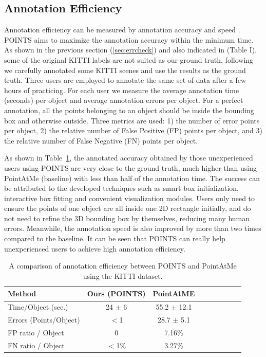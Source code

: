 \documentclass[letterpaper, 10 pt, conference]{ieeeconf}  %
\begin{document}
\subsection{Annotation Efficiency}

Annotation efficiency can be measured by annotation accuracy and speed \cite{pointatme} \cite{Zimmer20193DBA}. POINTS aims to maximize the annotation accuracy within the minimum time.
As shown in the previous section (\ref{sec:errcheck}) and also indicated in  \cite{pointatme} (Table I), some of the original KITTI labels are not suited as our ground truth, following \cite{pointatme} we carefully annotated some KITTI scenes and use the results as the ground truth.
Three users are employed to annotate the same set of data after a few hours of practicing. 
For each user we measure the average annotation time (seconds) per object and average annotation errors per object.
For a perfect annotation, all the points belonging to an object should be inside the bounding box and otherwise outside. 
Three metrics are used: 1) the number of error points per object, 
2) the relative number of False Positive (FP) points per object, and 
3) the relative number of False Negative (FN) points per object. 

As shown in Table~\ref{tab:annotation-evaluation}, the annotated accuracy obtained by those unexperienced users using POINTS are very close to the ground truth,
much higher than using PointAtMe (baseline) with less than half of the annotation time. 
The success can be attributed to the developed techniques such as smart box initialization, interactive box fitting and convenient visualization modules. 
Users only need to ensure the points of one object are all inside one 2D rectangle initially, and do not need to refine the 3D bounding box by themselves, 
reducing many human errors. 
Meanwhile, the annotation speed is also improved by more than two times compared to the baseline. 
It can be seen that POINTS can really help unexperienced users to achieve high annotation efficiency. 



\begin{table}[h]
	\centering
	\caption{A comparison of annotation efficiency between POINTS and PointAtMe using the KITTI dataset.}
	\label{tab:annotation-evaluation}
	\begin{tabular}{|l|c|c|c|c||c|c|c|c|}
		\hline
		\textbf{Method} & \textbf{Ours (POINTS)} & \textbf{PointAtME\cite{pointatme}} \\
		\hline
		\hline
		Time/Object (sec.) & 24 $\pm$ 6 & 55.2 $\pm$ 12.1\\
		\hline
		Errors (Points/Object) & $<$1 & 28.7 $\pm$ 5.1\\
		\hline
		FP ratio / Object & 0 & 7.16\%\\
		\hline
		FN ratio / Object & $<$1\% & 3.27\%\\
		\hline
	\end{tabular}
\end{table}
\end{document}
